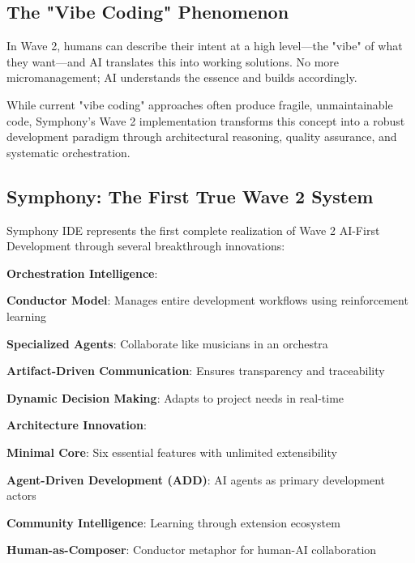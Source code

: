 \subsection{The "Vibe Coding" Phenomenon}
\label{subsec:vibe-coding}

In Wave 2, humans can describe their intent at a high level—the "vibe" of what they want—and AI translates this into working solutions. No more micromanagement; AI understands the essence and builds accordingly.

\begin{infobox}[title=Vibe Coding Evolution]
While current "vibe coding" approaches often produce fragile, unmaintainable code, Symphony's Wave 2 implementation transforms this concept into a robust development paradigm through architectural reasoning, quality assurance, and systematic orchestration.
\end{infobox}

\subsection{Symphony: The First True Wave 2 System}
\label{subsec:symphony-wave-2}

Symphony IDE represents the first complete realization of Wave 2 AI-First Development through several breakthrough innovations:

\textbf{Orchestration Intelligence}:
\begin{compactlist}
    \item \textbf{Conductor Model}: Manages entire development workflows using reinforcement learning
    \item \textbf{Specialized Agents}: Collaborate like musicians in an orchestra
    \item \textbf{Artifact-Driven Communication}: Ensures transparency and traceability
    \item \textbf{Dynamic Decision Making}: Adapts to project needs in real-time
\end{compactlist}

\textbf{Architecture Innovation}:
\begin{compactlist}
    \item \textbf{Minimal Core}: Six essential features with unlimited extensibility
    \item \textbf{Agent-Driven Development (ADD)}: AI agents as primary development actors
    \item \textbf{Community Intelligence}: Learning through extension ecosystem
    \item \textbf{Human-as-Composer}: Conductor metaphor for human-AI collaboration
\end{compactlist}

